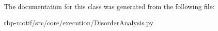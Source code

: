 The documentation for this class was generated from the following file\-:\begin{DoxyCompactItemize}
\item 
rbp-\/motif/src/core/execution/Disorder\-Analysis.\-py\end{DoxyCompactItemize}
